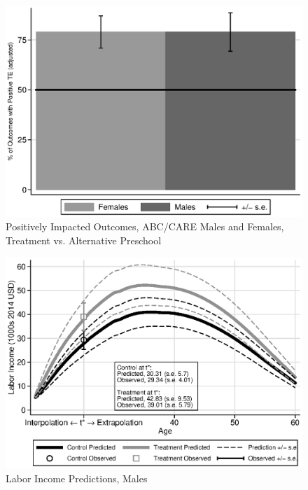 \begin{frame}[plain]
	\begin{center}
\begin{figure}[H] 
\caption{Positively Impacted Outcomes, ABC/CARE Males and Females,  Treatment vs. Alternative Preschool}
\label{figure:youlabel}
\centering
\includegraphics[width=.9\columnwidth]{output/epan_ipw_p1_all.eps}
\end{figure}
\end{center}
\end{frame}

\begin{frame}[plain]
	\begin{center}
\begin{figure}[H] 
\caption{Labor Income Predictions, Males}
\label{figure:youlabel}
\centering
\includegraphics[width=.9\columnwidth]{output/labor_25-65_pset1_mset3_male.eps}
\end{figure}
\end{center}
\end{frame}

